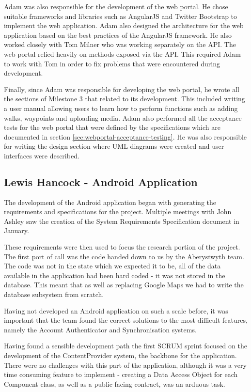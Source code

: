 \documentclass[11pt,a4paper]{report}
\begin{document}
Adam was also responsible for the development of the web portal. He chose suitable frameworks and libraries such as AngularJS and Twitter Bootstrap to implement the web application. Adam also designed the architecture for the web application based on the best practices of the AngularJS framework. He also worked closely with Tom Milner who was  working separately on the API. The web portal relied heavily on methods exposed via the API. This required Adam to work with Tom in order to fix problems that were encountered during development.

Finally, since Adam was responsible for developing the web portal, he wrote all the sections of Milestone 3 that related to its development. This included writing a user manual allowing users to learn how to perform functions such as adding walks, waypoints and uploading media. Adam also performed all the acceptance tests for the web portal that were defined by the specifications which are documented in section \ref{sec:webportal-acceptance-testing}. He was also responsible for writing the design section where UML diagrams were created and user interfaces were described.

\subsection{Lewis Hancock - Android Application}
The development of the Android application began with generating the requirements and specifications for the project. Multiple meetings with John Ashley saw the creation of the System Requirements Specification document in January. 

These requirements were then used to focus the research portion of the project. The first port of call was the code handed down to us by the Aberystwyth team. The code was not in the state which we expected it to be, all of the data available in the application had been hard coded - it was not stored in the database. This meant that as well as replacing Google Maps we had to write the database subsystem from scratch.

Having not developed an Android application on such a scale before, it was important that the team found the correct solutions to the most difficult features, namely the Account Authenticator and Synchronisation systems. 

Having found a sensible development path the first SCRUM sprint focused on the development of the ContentProvider system, the backbone for the application. There were no challenges with this part of the application, although it was a very time consuming feature to implement - creating a Data Access Object for each Component class, as well as a public facing contract, was an arduous task.
\end{document}
